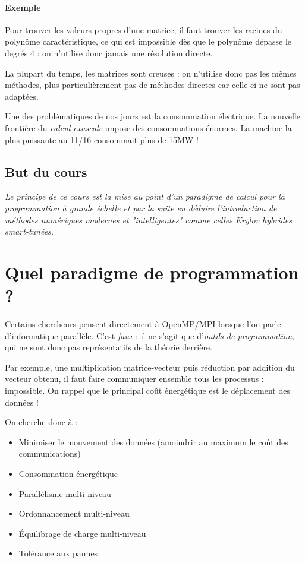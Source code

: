 \documentclass{article}
\begin{document}
\paragraph{Exemple} Pour trouver les valeurs propres d'une matrice, il faut trouver les racines du polynôme caractéristique, ce qui est impossible dès que le polynôme dépasse le degrés 4 : on n'utilise donc jamais une résolution directe.
\bigskip

La plupart du temps, les matrices sont creuses : on n'utilise donc pas les mêmes méthodes, plus particulièrement pas de méthodes directes car celle-ci ne sont pas adaptées.
\bigskip

Une des problématiques de nos jours est la consommation électrique. La nouvelle frontière du \emph{calcul exascale} impose des consommations énormes. La machine la plus puissante au 11/16 consommait plus de 15MW !

\subsection{But du cours}
\textit{Le principe de ce cours est la mise au point d'un paradigme de calcul pour la programmation à grande échelle et par la suite en déduire l'introduction de méthodes numériques modernes et "intelligentes" comme celles Krylov hybrides smart-tunées.}


\section{Quel paradigme de programmation ?}
Certains chercheurs pensent directement à OpenMP/MPI lorsque l'on parle d'informatique parallèle. C'est \emph{faux} : il ne s'agit que d'\emph{outils de programmation}, qui ne sont donc pas représentatifs de la théorie derrière.

Par exemple, une multiplication matrice-vecteur puis réduction par addition du vecteur obtenu, il faut faire communiquer ensemble tous les processus : impossible. On rappel que le principal coût énergétique est le déplacement des données !

On cherche donc à :
\begin{itemize}
\item Minimiser le mouvement des données (amoindrir au maximum le coût des communications)
\item Consommation énergétique
\item Parallélisme multi-niveau
\item Ordonnancement multi-niveau
\item Équilibrage de charge multi-niveau
\item Tolérance aux pannes
\end{itemize}
\end{document}

